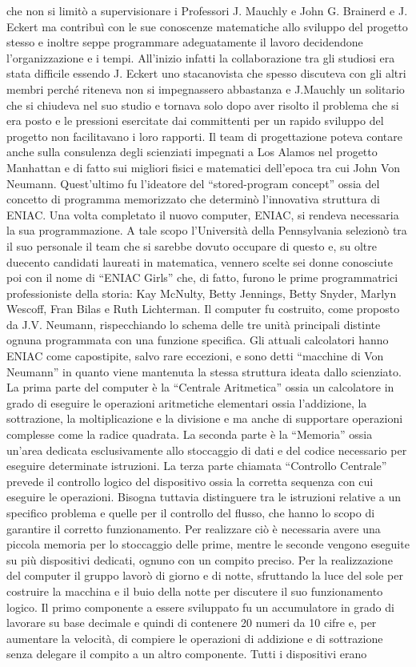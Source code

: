 che non si limitò a supervisionare i Professori J. Mauchly e John G. Brainerd e J. Eckert ma contribuì con le sue conoscenze matematiche allo sviluppo del progetto stesso e inoltre seppe programmare adeguatamente il lavoro decidendone l’organizzazione e i tempi. All’inizio infatti la collaborazione tra gli studiosi era stata difficile essendo J. Eckert uno stacanovista che spesso discuteva con gli altri membri perché riteneva non si impegnassero abbastanza e J.Mauchly un solitario che si chiudeva nel suo studio e tornava solo dopo aver risolto il problema che si era posto e le pressioni esercitate dai committenti per un rapido sviluppo del progetto non facilitavano i loro rapporti.  Il team di progettazione poteva contare anche sulla consulenza degli scienziati impegnati a Los Alamos nel progetto Manhattan e di fatto sui migliori fisici e matematici dell’epoca tra cui John Von Neumann. Quest’ultimo fu l’ideatore del “stored-program concept” ossia del concetto di programma memorizzato che determinò l’innovativa struttura di ENIAC.  Una volta completato il nuovo computer, ENIAC, si rendeva necessaria la sua programmazione.  A tale scopo l’Università della Pennsylvania selezionò tra il suo personale il team che si sarebbe dovuto occupare di questo e, su oltre duecento candidati laureati in matematica, vennero scelte sei donne conosciute poi con il nome di “ENIAC Girls” che, di fatto, furono le prime programmatrici professioniste della storia: Kay McNulty, Betty Jennings, Betty Snyder, Marlyn Wescoff, Fran Bilas e Ruth Lichterman.  Il computer fu costruito, come proposto da J.V. Neumann, rispecchiando lo schema delle tre unità principali distinte ognuna programmata con una funzione specifica. Gli attuali calcolatori hanno ENIAC come capostipite, salvo rare eccezioni, e sono detti “macchine di Von Neumann” in quanto viene mantenuta la stessa struttura ideata dallo scienziato. La prima parte del computer è la “Centrale Aritmetica” ossia un calcolatore in grado di eseguire le operazioni aritmetiche elementari ossia l’addizione, la sottrazione, la moltiplicazione e la divisione e ma anche di supportare operazioni complesse come la radice quadrata. La seconda parte è la “Memoria” ossia un’area dedicata esclusivamente allo stoccaggio di dati e del codice necessario per eseguire determinate istruzioni. La terza parte chiamata “Controllo Centrale” prevede il controllo logico del dispositivo ossia la corretta sequenza con cui eseguire le operazioni. Bisogna tuttavia distinguere tra le istruzioni relative a un specifico problema e quelle per il controllo del flusso, che hanno lo scopo di garantire il corretto funzionamento. Per realizzare ciò è necessaria avere una piccola memoria per lo stoccaggio delle prime, mentre le seconde vengono eseguite su più dispositivi dedicati, ognuno con un compito preciso. Per la realizzazione del computer il gruppo lavorò di giorno e di notte, sfruttando la luce del sole per costruire la macchina e il buio della notte per discutere il suo funzionamento logico. Il primo componente a essere sviluppato fu un accumulatore in grado di lavorare su base decimale e quindi di contenere 20 numeri da 10 cifre e, per aumentare la velocità, di compiere le operazioni di addizione e di sottrazione senza delegare il compito a un altro componente. Tutti i dispositivi erano 